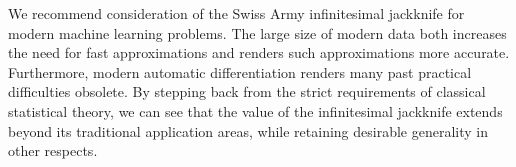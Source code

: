 We recommend consideration of the Swiss Army infinitesimal jackknife for modern
machine learning problems.  The large size of modern data both increases the
need for fast approximations and renders such approximations more accurate.
Furthermore, modern automatic differentiation renders many past practical
difficulties obsolete. By stepping back from the strict requirements of
classical statistical theory, we can see that the value of the infinitesimal
jackknife extends beyond its traditional application areas, while retaining
desirable generality in other respects.

